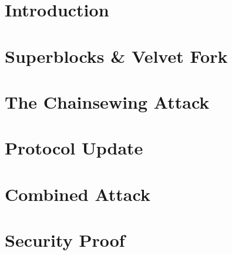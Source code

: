 \section{Introduction}


\section{Superblocks \& Velvet Fork}


\section{The Chainsewing Attack}


\section{Protocol Update}


\section{Combined Attack}


\section{Security Proof}




\begin{acks}
\end{acks}
